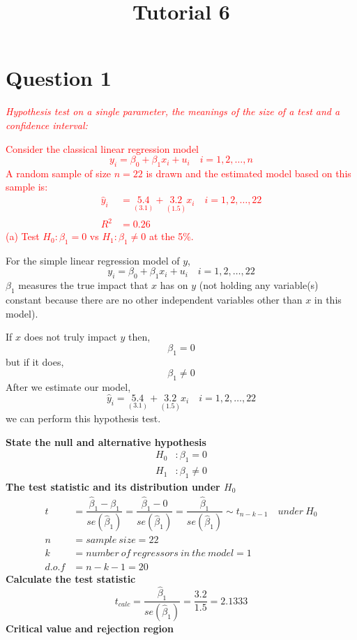\documentclass[12pt]{report}
\title{Tutorial 6}
\subtitle
{
\textbf{keywords}: hypothesis testing, t-test, F-test, test statistic, critical value, confidence intervals, R-squared, interpretation of coefficients, multiple linear regression, reparameterisation

\textbf{estimated reading time}: 33 minutes
}
\begin{document}
\maketitle

\section*{Question 1}
\noindent \textcolor{red}{\textit{Hypothesis test on a single parameter, the meanings of the size of a test and a confidence interval:}}

\noindent \textcolor{red}{Consider the classical linear regression model $$y_i = \beta_0 + \beta_1 x_i + u_i \quad i=1,2,\dots,n$$ A random sample of size $n=22$ is drawn and the estimated model based on this sample is:
\begin{align*}
	\hat{y}_i &= \underset{(3.1)}{5.4} + \underset{(1.5)}{3.2}x_i \quad i=1,2,\dots,22 \\
	R^2 &= 0.26 
\end{align*} (a) Test $H_0: \beta_1 = 0$ vs $H_1: \beta_1 \neq 0$ at the 5\%.}

\noindent For the simple linear regression model of $y$, $$y_i = \beta_0 + \beta_1 x_i + u_i \quad i=1,2,\dots,22$$ $\beta_1$ measures the true impact that $x$ has on $y$ (not holding any variable(s) constant because there are no other independent variables other than $x$ in this model). 

\noindent If $x$ does not truly impact $y$ then, $$\beta_1 = 0$$ but if it does,  $$\beta_1 \neq 0$$ After we estimate our model, $$\hat{y}_i = \underset{(3.1)}{5.4} + \underset{(1.5)}{3.2}x_i \quad i=1,2,\dots,22$$ we can perform this hypothesis test.

\noindent \textbf{State the null and alternative hypothesis}
\begin{align*}
H_0&: \beta_1 = 0 \\
H_1&: \beta_1 \neq 0
\end{align*}
\noindent \textbf{The test statistic and its distribution under $H_0$}
\begin{align*}
t &= \dfrac{\hat{\beta}_1 - \beta_1}{se(\hat{\beta}_1)} = \dfrac{\hat{\beta}_1 - 0}{se(\hat{\beta}_1)} = \dfrac{\hat{\beta}_1}{se(\hat{\beta}_1)} \sim t_{n-k-1} \quad under\ H_0 \\
n &= sample\ size = 22 \\
k &= number\ of\ regressors\ in\ the\ model = 1 \\
d.o.f &= n-k-1=20
\end{align*}
\noindent \textbf{Calculate the test statistic}
$$t_{calc} = \dfrac{\hat{\beta}_1}{se(\hat{\beta}_1)} = \dfrac{3.2}{1.5} = 2.1333$$
\noindent \textbf{Critical value and rejection region}
\end{document}
